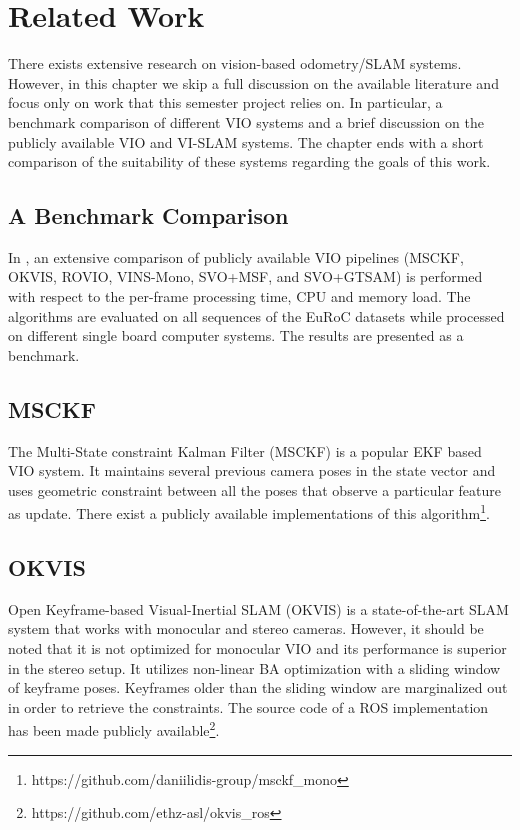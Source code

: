 \chapter{Related Work}
\label{sec:relatedWork}

There exists extensive research on vision-based odometry/\ac{SLAM} systems. 
However, in 
this chapter we skip a full discussion on the available literature and focus 
only on work that this semester project relies on. In particular, a benchmark 
comparison of different \ac{VIO} systems and a brief discussion on the publicly
available \ac{VIO} and VI-SLAM systems. The chapter ends with a short 
comparison 
of the suitability of these systems regarding the goals of this work. 


\section{A Benchmark Comparison}
In \citep{Delmerico2018Benchmark}, an extensive comparison of publicly 
available \ac{VIO} pipelines (MSCKF, OKVIS, ROVIO, VINS-Mono, SVO+MSF, and 
SVO+GTSAM) is performed with respect to the per-frame processing time, CPU and 
memory load. The algorithms are evaluated on all sequences of the EuRoC 
datasets while processed on different single board computer systems. The 
results are presented as a benchmark. 



\section{MSCKF}
The Multi-State constraint Kalman Filter (MSCKF) \citep{Mourikis2007MSCKF} is a 
popular \ac{EKF} based \ac{VIO} system. It maintains several previous camera 
poses in 
the state vector and uses geometric constraint between all the poses that 
observe a particular feature as update. There exist a publicly available 
implementations of this 
algorithm\footnote{https://github.com/daniilidis-group/msckf\_mono}.


\section{OKVIS}
Open Keyframe-based Visual-Inertial SLAM (OKVIS) \citep{Leutenegger2015} is a 
state-of-the-art \ac{SLAM} system that works with monocular and stereo cameras. 
However, it should be noted that it is not optimized for monocular \ac{VIO} and 
its performance is superior in the stereo setup. It utilizes non-linear 
\ac{BA} optimization with a sliding window of keyframe poses. Keyframes older 
than the 
sliding window are marginalized out in order to retrieve the constraints. The 
source code of a \ac{ROS} implementation has been made publicly 
available\footnote{https://github.com/ethz-asl/okvis\_ros}.



